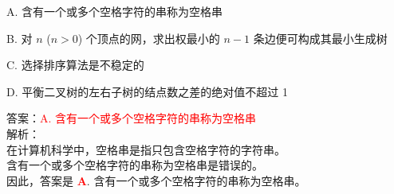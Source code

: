 \documentclass[lang=cn,newtx,10pt,scheme=chinese]{../../../elegantbook}
\begin{document}
\begin{enumerate}
    A. 含有一个或多个空格字符的串称为空格串  

    B. 对 $n$ ($n > 0$) 个顶点的网，求出权最小的 $n-1$ 条边便可构成其最小生成树  

    C. 选择排序算法是不稳定的  

    D. 平衡二叉树的左右子树的结点数之差的绝对值不超过 1   

    答案：\textcolor{red}{A. 含有一个或多个空格字符的串称为空格串}\\
    解析：\\
    在计算机科学中，空格串是指只包含空格字符的字符串。\\
    含有一个或多个空格字符的串称为空格串是错误的。\\
    因此，答案是 \textbf{\textcolor{red}{A}}. 含有一个或多个空格字符的串称为空格串。\\
\end{enumerate}
\end{document}
